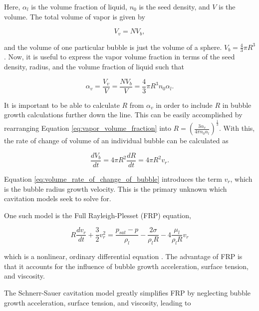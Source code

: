 \documentclass{UCF_ETD}
\begin{document}
Here, $\alpha_{l}$ is the volume fraction of liquid, $n_{0}$ is the seed density, and $V$ is the volume. The total volume of vapor is given by

\begin{equation}
    V_{v} = N V_{b},
    \label{eq:total_vapor_volume}
\end{equation}

and the volume of one particular bubble is just the volume of a sphere. $V_{b} = \frac{4}{3}\pi R^{3}$. Now, it is useful to express the vapor volume fraction in terms of the seed density, radius, and the volume fraction of liquid such that

\begin{equation}
    \alpha_{v} = \frac{V_{v}}{V} = \frac{NV_{b}}{V} = \frac{4}{3}\pi R^{3} n_{0} \alpha_{l}.
    \label{eq:vapor_volume_fraction}
\end{equation}

It is important to be able to calculate $R$ from $\alpha_{v}$ in order to include $R$ in bubble growth calculations further down the line. This can be easily accomplished by rearranging Equation \ref{eq:vapor_volume_fraction} into $R=\left( \frac{3\alpha_{v}}{4\pi n_{0} \alpha_{l}} \right)^{\frac{1}{3}}$. With this, the rate of change of volume of an individual bubble can be calculated as

\begin{equation}
    \frac{dV_{b}}{dt} = 4\pi R^{2} \frac{dR}{dt} = 4\pi R^{2} v_{r}.
    \label{eq:volume_rate_of_change_of_bubble}
\end{equation}

Equation \ref{eq:volume_rate_of_change_of_bubble} introduces the term $v_{r}$, which is the bubble radius growth velocity. This is the primary unknown which cavitation models seek to solve for.

One such model is the Full Rayleigh-Plesset (FRP) equation,

\begin{equation}
    R\frac{dv_{r}}{dt} + \frac{3}{2} v_{r}^{2} = \frac{p_{sat} - p}{\rho_{l}} - \frac{2\sigma}{\rho_{l}R} - 4\frac{\mu_{l}}{\rho_{l}R}v_{r}
    \label{eq:Rayleigh-Plesset}
\end{equation}

which is a nonlinear, ordinary differential equation \cite{rayleigh1917, plesset1949}. The advantage of FRP is that it accounts for the influence of bubble growth acceleration, surface tension, and viscosity. 

The Schnerr-Sauer cavitation model \cite{schnerr2001physical} greatly simplifies FRP by neglecting bubble growth acceleration, surface tension, and viscosity, leading to 
\end{document}
